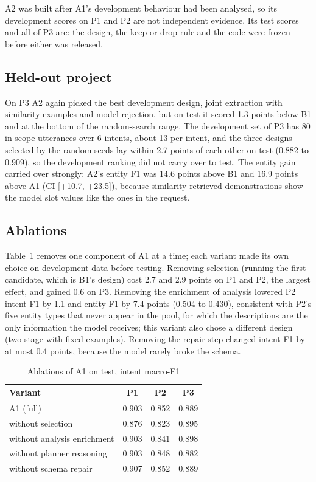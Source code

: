\documentclass[conference]{IEEEtran}
\begin{document}
A2 was built after A1's development behaviour had been analysed, so its development scores on P1 and P2 are not independent evidence. Its test scores and all of P3 are: the design, the keep-or-drop rule and the code were frozen before either was released.

\subsection{Held-out project}

On P3 A2 again picked the best development design, joint extraction with similarity examples and model rejection, but on test it scored 1.3 points below B1 and at the bottom of the random-search range. The development set of P3 has 80 in-scope utterances over 6 intents, about 13 per intent, and the three designs selected by the random seeds lay within 2.7 points of each other on test (0.882 to 0.909), so the development ranking did not carry over to test. The entity gain carried over strongly: A2's entity F1 was 14.6 points above B1 and 16.9 points above A1 (CI [+10.7, +23.5]), because similarity-retrieved demonstrations show the model slot values like the ones in the request.

\subsection{Ablations}

Table~\ref{tab:ablation} removes one component of A1 at a time; each variant made its own choice on development data before testing. Removing selection (running the first candidate, which is B1's design) cost 2.7 and 2.9 points on P1 and P2, the largest effect, and gained 0.6 on P3. Removing the enrichment of analysis lowered P2 intent F1 by 1.1 and entity F1 by 7.4 points (0.504 to 0.430), consistent with P2's five entity types that never appear in the pool, for which the descriptions are the only information the model receives; this variant also chose a different design (two-stage with fixed examples). Removing the repair step changed intent F1 by at most 0.4 points, because the model rarely broke the schema.

\begin{table}[t]
\centering
\caption{Ablations of A1 on test, intent macro-F1}
\label{tab:ablation}
\small
\setlength{\tabcolsep}{5pt}
\begin{tabular}{@{}lccc@{}}
\toprule
Variant & P1 & P2 & P3 \\
\midrule
A1 (full) & 0.903 & 0.852 & 0.889 \\
without selection & 0.876 & 0.823 & 0.895 \\
without analysis enrichment & 0.903 & 0.841 & 0.898 \\
without planner reasoning & 0.903 & 0.848 & 0.882 \\
without schema repair & 0.907 & 0.852 & 0.889 \\
\bottomrule
\end{tabular}
\end{table}
\end{document}
